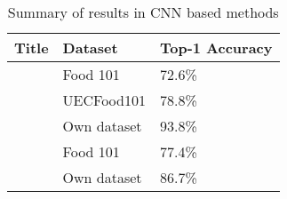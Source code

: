 \begin{table}[h]
	\centering
	\caption{Summary of results in CNN based methods}
	\label{cnn_summary}
	\begin{tabular}{|p{4.5cm}|l|l|}
	\hline
		\textbf{Title}                                & \textbf{Dataset}     & \textbf{Top-1 Accuracy} \\ \hline
		\parencite{deepLearning} 			 & Food 101    & 72.6\%  \\ \hline
		\parencite{yanaiFood}               	 & UECFood101  & 78.8\%  \\ \hline
		\parencite{kagayaFood}       		 & Own dataset & 93.8\%   \\ \hline
		\parencite{deepFood}                  & Food 101    & 77.4\%  	\\ \hline
		\parencite{nutrinet}                  & Own dataset & 86.7\% \\ \hline
	\end{tabular}
\end{table}

